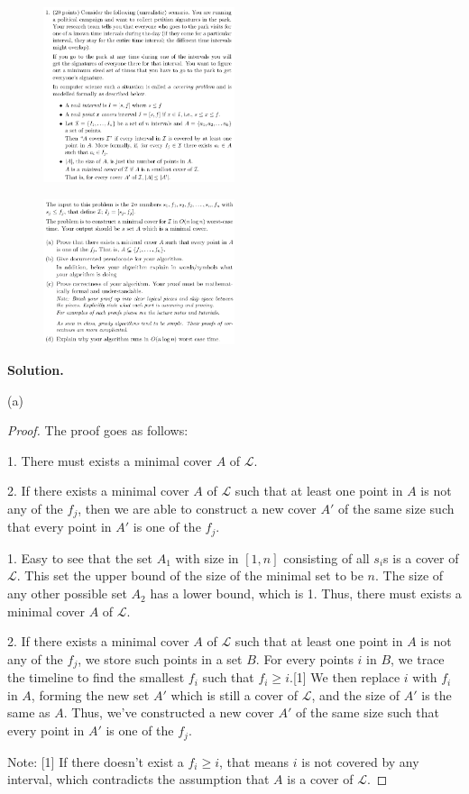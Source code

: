 \documentclass[10pt]{article}
\begin{document}
\begin{figure}[h]
	\centering
	\includegraphics[width=0.5\textwidth]{hw3-1(1)}
\end{figure}
\begin{figure}[h]
	\centering
	\includegraphics[width=0.5\textwidth]{hw3-1(2)}
\end{figure}

\newpage

\textbf{Solution.}

(a)
\begin{proof}
	The proof goes as follows:

	1. There must exists a minimal cover $A$ of $\mathscr{L}$.

	2. If there exists a minimal cover $A$ of $\mathscr{L}$ such that at least one point in $A$ is not any of the $f_j$, then we are able to construct a new cover $A'$ of the same size such that every point in $A'$ is one of the $f_j$.

	1. Easy to see that the set $A_1$ with size in $[1,n]$ consisting of all $s_i$s is a cover of $\mathscr{L}$. This set the upper bound of the size of the minimal set to be $n$. The size of any other possible set $A_2$ has a lower bound, which is 1. Thus, there must exists a minimal cover $A$ of $\mathscr{L}$.

	2. If there exists a minimal cover $A$ of $\mathscr{L}$ such that at least one point in $A$ is not any of the $f_j$, we store such points in a set $B$. For every points $i$ in $B$, we trace the timeline to find the smallest $f_i$ such that $f_i \geq i$.[1] We then replace $i$ with $f_i$ in $A$, forming the new set $A'$ which is still a cover of $\mathscr{L}$, and the size of $A'$ is the same as $A$. Thus, we've constructed a new cover $A'$ of the same size such that every point in $A'$ is one of the $f_j$.

	Note: [1] If there doesn't exist a $f_i \geq i$, that means $i$ is not covered by any interval, which contradicts the assumption that $A$ is a cover of $\mathscr{L}$.
\end{proof}
\end{document}
